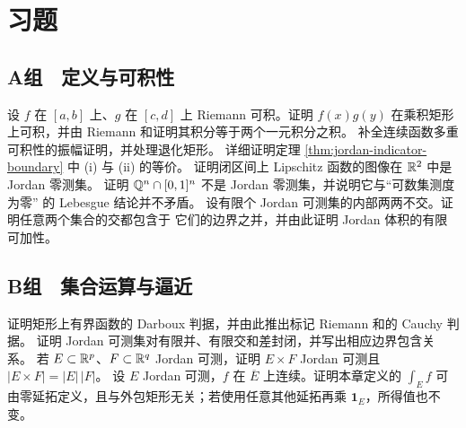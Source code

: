 \section*{习题}

\subsection*{A组　定义与可积性}
\begin{enumerate}[label=\textbf{\thechapter.\arabic*.}]
 设 $f$ 在 $[a,b]$ 上、$g$ 在 $[c,d]$ 上 Riemann 可积。证明
 $f(x)g(y)$ 在乘积矩形上可积，并由 Riemann 和证明其积分等于两个一元积分之积。
 补全连续函数多重可积性的振幅证明，并处理退化矩形。
 详细证明定理 \ref{thm:jordan-indicator-boundary} 中 (i) 与 (ii) 的等价。
 证明闭区间上 Lipschitz 函数的图像在 $\mathbb{R}^2$ 中是 Jordan 零测集。
 证明 $\mathbb{Q}^n\cap[0,1]^n$ 不是 Jordan 零测集，并说明它与“可数集测度为零”
 的 Lebesgue 结论并不矛盾。
 设有限个 Jordan 可测集的内部两两不交。证明任意两个集合的交都包含于
 它们的边界之并，并由此证明 Jordan 体积的有限可加性。
\end{enumerate}

\subsection*{B组　集合运算与逼近}
\begin{enumerate}[label=\textbf{\thechapter.\arabic*.},resume]
 证明矩形上有界函数的 Darboux 判据，并由此推出标记 Riemann 和的 Cauchy
 判据。
 证明 Jordan 可测集对有限并、有限交和差封闭，并写出相应边界包含关系。
 若 $E\subset\mathbb{R}^p$、$F\subset\mathbb{R}^q$ Jordan 可测，证明
 $E\times F$ Jordan 可测且 $|E\times F|=|E|\,|F|$。
 设 $E$ Jordan 可测，$f$ 在 $\overline E$ 上连续。证明本章定义的
 $\int_Ef$ 可由零延拓定义，且与外包矩形无关；若使用任意其他延拓再乘
 $\mathbf1_E$，所得值也不变。
\end{enumerate}
